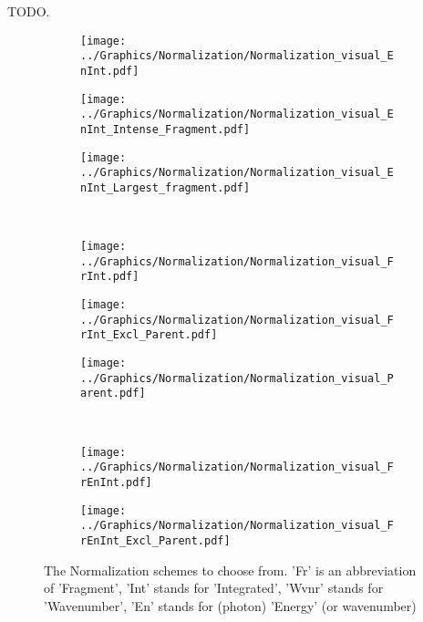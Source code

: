 TODO.

\begin{figure}[h!]
	\centering
	\begin{subfigure}{.25\textwidth}
		\centering
		\texttt{[image: ../Graphics/Normalization/Normalization\_visual\_EnInt.pdf]}
		\label{fig:MetEnk_sequence_notation}
	\end{subfigure}
	\begin{subfigure}{.25\textwidth}
		\centering
		\texttt{[image: ../Graphics/Normalization/Normalization\_visual\_EnInt\_Intense\_Fragment.pdf]}
		\label{fig:MetEnk_sequence_notation}
	\end{subfigure}
	\begin{subfigure}{.25\textwidth}
		\centering
		\texttt{[image: ../Graphics/Normalization/Normalization\_visual\_EnInt\_Largest\_fragment.pdf]}
		\label{fig:MetEnk_sequence_notation}
	\end{subfigure}
\\
	\begin{subfigure}{.25\textwidth}
		\centering
		\texttt{[image: ../Graphics/Normalization/Normalization\_visual\_FrInt.pdf]}
		\label{fig:MetEnk_sequence_notation}
	\end{subfigure}
	\begin{subfigure}{.25\textwidth}
		\centering
		\texttt{[image: ../Graphics/Normalization/Normalization\_visual\_FrInt\_Excl\_Parent.pdf]}
		\label{fig:MetEnk_sequence_notation}
	\end{subfigure}
	\begin{subfigure}{.25\textwidth}
		\centering
		\texttt{[image: ../Graphics/Normalization/Normalization\_visual\_Parent.pdf]}
		\label{fig:MetEnk_sequence_notation}
	\end{subfigure}
\\
	\begin{subfigure}{.25\textwidth}
		\centering
		\texttt{[image: ../Graphics/Normalization/Normalization\_visual\_FrEnInt.pdf]}
		\label{fig:MetEnk_sequence_notation}
	\end{subfigure}
	\begin{subfigure}{.3\textwidth}
		\centering
		\texttt{[image: ../Graphics/Normalization/Normalization\_visual\_FrEnInt\_Excl\_Parent.pdf]}
		\label{fig:MetEnk_sequence_notation}
	\end{subfigure}
\caption{The Normalization schemes to choose from. 'Fr' is an abbreviation of 'Fragment', 'Int' stands for 'Integrated', 'Wvnr' stands for 'Wavenumber', 'En' stands for (photon) 'Energy' (or wavenumber)}
\end{figure}